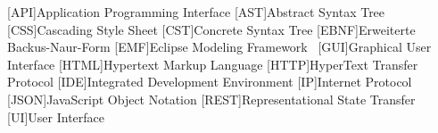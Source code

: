 
\begin{acronym}
    [API]{Application Programming Interface}
    [AST]{Abstract Syntax Tree}
    [CSS]{Cascading Style Sheet}
    [CST]{Concrete Syntax Tree}
    [EBNF]{Erweiterte Backus-Naur-Form}
    [EMF]{Eclipse Modeling Framework~\cite{emf}}
    [GUI]{Graphical User Interface}
    [HTML]{Hypertext Markup Language}
    [HTTP]{HyperText Transfer Protocol}
    [IDE]{Integrated Development Environment}
    [IP]{Internet Protocol}
    [JSON]{JavaScript Object Notation}
    [REST]{Representational State Transfer}
    [UI]{User Interface}
\end{acronym}

